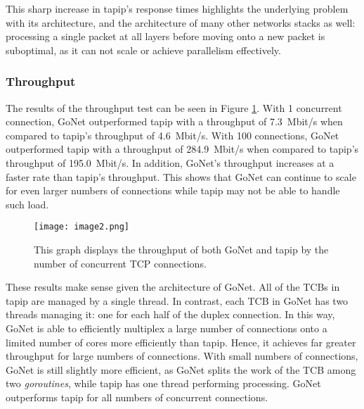 \documentclass[twocolumn,10pt]{article}
\begin{document}
This sharp increase in tapip's response times highlights the underlying problem with its architecture, and the architecture of many other networks stacks as well: processing a single packet at all layers before moving onto a new packet is suboptimal, as it can not scale or achieve parallelism effectively. 

\subsubsection{Throughput}
The results of the throughput test can be seen in Figure \ref{fig:throughput}. With 1 concurrent connection, GoNet outperformed tapip with a throughput of 7.3~Mbit/s when compared to tapip's throughput of 4.6~Mbit/s. With 100 connections, GoNet outperformed tapip with a throughput of 284.9~Mbit/s when compared to tapip's throughput of 195.0~Mbit/s. In addition, GoNet's throughput increases at a faster rate than tapip's throughput. This shows that GoNet can continue to scale for even larger numbers of connections while tapip may not be able to handle such load. 

\begin{figure}
\begin{center}
  \texttt{[image: image2.png]}
  \caption{This graph displays the throughput of both GoNet and tapip by the number of concurrent TCP connections. }
  \label{fig:throughput}
\end{center}
\end{figure}

These results make sense given the architecture of GoNet. All of the TCBs in tapip are managed by a single thread. In contrast, each TCB in GoNet has two threads managing it: one for each half of the duplex connection. In this way, GoNet is able to efficiently multiplex a large number of connections onto a limited number of cores more efficiently than tapip. Hence, it achieves far greater throughput for large numbers of connections. With small numbers of connections, GoNet is still slightly more efficient, as GoNet splits the work of the TCB among two \textit{goroutines}, while tapip has one thread performing processing. GoNet outperforms tapip for all numbers of concurrent connections. 
\end{document}
